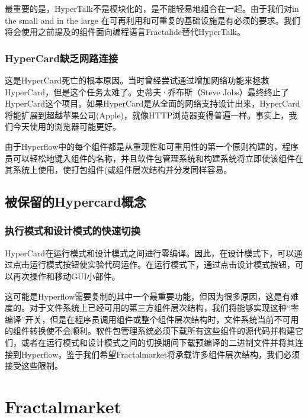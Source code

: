 \documentclass[%
 aip,
 jmp,
 amsmath,amssymb,
 preprint,
 reprint,
 author-year,
 author-numerical,
]{revtex4-1}
\begin{document}
\begin{CJK}{UTF8}{gbsn}
最重要的是，HyperTalk不是模块化的，是不能轻易地组合在一起。由于我们对in the small and in the large 在可再利用和可重复的基础设施是有必须的要求。我们将会使用之前提及的组件面向编程语言Fractalide替代HyperTalk。

\subsubsection{\label{sec:HyperCard lacked network access}HyperCard缺乏网路连接}

这是HyperCard死亡的根本原因。当时曾经尝试通过增加网络功能来拯救HyperCard，但是这个任务太难了。史蒂夫·乔布斯（Steve Jobs）最终终止了HyperCard这个项目。如果HyperCard是从全面的网络支持设计出来，HyperCard将能扩展到超越苹果公司(Apple)，就像HTTP浏览器变得普遍一样。事实上，我们今天使用的浏览器可能更好。


由于Hyperflow中的每个组件都是从重现性和可重用性的第一个原则构建的，程序员可以轻松地键入组件的名称，并且软件包管理系统和构建系统将立即使该组件在其系统上使用，使打包组件(或组件层次结构并分发同样容易。

\subsection{\label{sec:concepts to keep from hypercard}被保留的Hypercard概念}
\subsubsection{\label{sec:fast switching between run mode and design mode}执行模式和设计模式的快速切换}

HyperCard在运行模式和设计模式之间进行零编译。因此，在设计模式下，可以通过点击运行模式按钮使实验代码运作。在运行模式下，通过点击设计模式按钮，可以再次操作和移动GUI小部件。

这可能是Hyperflow需要复制的其中一个最重要功能，但因为很多原因，这是有难度的。对于文件系统上已经可用的第三方组件层次结构，我们将能够实现这种“零编译”开关，但是在程序员调用组件或整个组件层次结构时，文件系统当前不可用的组件转换使不会顺利。软件包管理系统必须下载所有这些组件的源代码并构建它们，或者在运行模式和设计模式之间的切换期间下载预编译的二进制文件并将其连接到Hyperflow。鉴于我们希望Fractalmarket将承载许多组件层次结构，我们必须接受这些限制。


\section{\label{sec:Fractalmarket}Fractalmarket}


\end{CJK}
\end{document}
